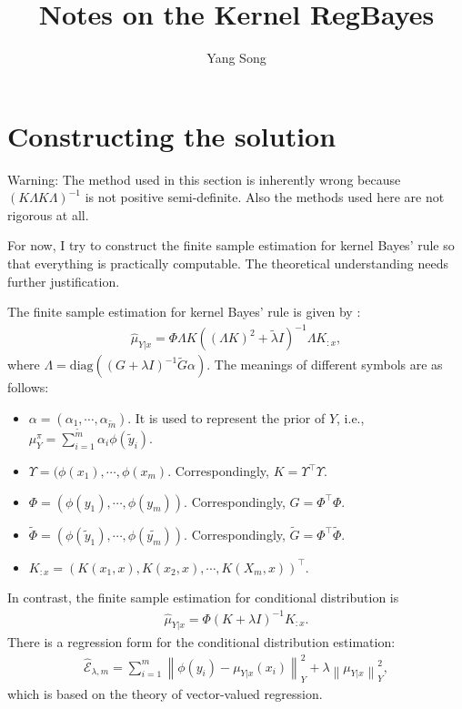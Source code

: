 \documentclass[a4paper]{article}
\title{Notes on the Kernel RegBayes}
\author{Yang Song}
\date{}
\newcommand{\up}{\mathrm}
\newcommand{\norm}[1]{\left\lVert#1\right\rVert}
\begin{document}
\maketitle
\section{Constructing the solution}
{\color{red}Warning: The method used in this section is inherently wrong because $(K\Lambda K\Lambda)^{-1}$ is not positive semi-definite. Also the methods used here are not rigorous at all.}

 For now, I try to construct the finite sample estimation for kernel Bayes' rule so that everything is practically computable. The theoretical understanding needs further justification.

The finite sample estimation for kernel Bayes' rule is given by \cite{song2013kernel}:
\begin{align}
\widehat{\mu}_{Y|x} = \Phi \Lambda K((\Lambda K)^2 + \tilde{\lambda} I)^{-1} \Lambda K_{:x} \label{eqn:f1},
\end{align}
where $\Lambda = \up{diag}((G+\lambda I)^{-1}\tilde{G}\alpha)$. The meanings of different symbols are as follows:
\begin{itemize}
\item $\alpha = (\alpha_1,\cdots,\alpha_{\tilde{m}})$. It is used to represent the prior of $Y$, i.e., $\mu_{Y}^{\pi} = \sum_{i=1}^{\tilde{m}} \alpha_i \phi(\tilde{y}_i)$.
\item $\Upsilon = (\phi(x_1),\cdots,\phi(x_m)$. Correspondingly, $K = \Upsilon^\intercal \Upsilon$.
\item $\Phi = (\phi(y_1),\cdots,\phi(y_m))$. Correspondingly, $G = \Phi^\intercal \Phi$.
\item $\tilde{\Phi} = (\phi(\tilde{y}_1),\cdots,\phi(\tilde{y_m}))$. Correspondingly, $\tilde{G} = \Phi^\intercal \tilde{\Phi}$.
\item $K_{:x} = (K(x_1,x),K(x_2,x),\cdots,K(X_m,x))^\intercal$.
\end{itemize}

In contrast, the finite sample estimation for conditional distribution is
\begin{align}
\widehat{\mu}_{Y|x} = \Phi (K+\lambda I)^{-1} K_{:x}.
\end{align}
There is a regression form for the conditional distribution estimation:
\begin{align}
\widehat{\mathcal{E}}_{\lambda,m} = \sum_{i=1}^m \norm{\phi(y_i) - \mu_{Y|x}(x_i)}_Y^2 + \lambda \norm{\mu_{Y|x}}_Y^2,
\end{align}
which is based on the theory of vector-valued regression.
\end{document}
